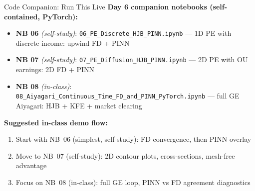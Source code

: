 \documentclass[aspectratio=169,11pt]{beamer}
\begin{document}
\begin{frame}{Code Companion: Run This Live}
\footnotesize
\textbf{Day 6 companion notebooks (self-contained, PyTorch):}
\begin{itemize}\itemsep2pt
    \item \textbf{NB 06} \textit{(self-study)}: \texttt{06\_PE\_Discrete\_HJB\_PINN.ipynb} --- 1D PE with discrete income: upwind FD + PINN
    \item \textbf{NB 07} \textit{(self-study)}: \texttt{07\_PE\_Diffusion\_HJB\_PINN.ipynb} --- 2D PE with OU earnings: 2D FD + PINN
    \item \textbf{NB 08} \textit{(in-class)}: \texttt{08\_Aiyagari\_Continuous\_Time\_FD\_and\_PINN\_PyTorch.ipynb} --- full GE Aiyagari: HJB + KFE + market clearing
\end{itemize}

\vspace{0.2em}
\textbf{Suggested in-class demo flow:}
\begin{enumerate}\itemsep1pt
    \item Start with NB~06 (simplest, self-study): FD convergence, then PINN overlay
    \item Move to NB~07 (self-study): 2D contour plots, cross-sections, mesh-free advantage
    \item Focus on NB~08 (in-class): full GE loop, PINN vs FD agreement diagnostics
\end{enumerate}
\end{frame}
\end{document}
